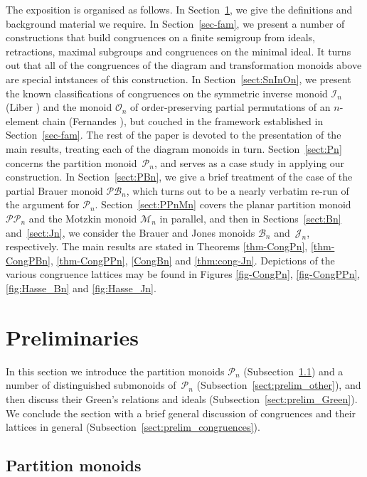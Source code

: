 \documentclass[11pt,a4paper]{article}
\newcommand{\PP}{\mathscr{P}\P}
\newcommand{\M}{\mathcal M}
\renewcommand{\O}{\mathcal O}
\newcommand{\I}{\mathcal I}
\newcommand{\B}{\mathcal B}
\renewcommand{\P}{\mathcal P}
\newcommand{\PB}{\mathcal{PB}}
\newcommand{\J}{\mathcal J}
\newcommand{\1}{\id_n}
\numberwithin{equation}{section}
\theoremstyle{definition}
\begin{document}
The exposition is organised as follows.  In Section~\ref{sect:prelim}, we give
the definitions and background material we require.  
%
In Section~\ref{sec-fam}, we present a number of constructions that build congruences on a finite semigroup from ideals, retractions, maximal subgroups and congruences on the minimal ideal.  It turns out that all of the congruences of the diagram and transformation monoids above are special intstances of this construction.  
%
In
Section~\ref{sect:SnInOn}, we present the known classifications of congruences
on the symmetric inverse monoid $\I_n$ (Liber \cite{Liber1953}) and the monoid
$\O_n$ of order-preserving partial permutations of an $n$-element chain (Fernandes
\cite{Fernandes2001}), but couched in the framework established in
Section~\ref{sec-fam}.  The rest of the paper is devoted to the
presentation of the main results, treating each of the diagram monoids in turn.
Section~\ref{sect:Pn} concerns the partition monoid~$\P_n$, and serves as
a case study in applying our construction.  In Section~\ref{sect:PBn}, we give a brief treatment of the case of the partial
Brauer monoid $\PB_n$, which turns out to be a nearly verbatim re-run of the
argument for $\P_n$.  Section~\ref{sect:PPnMn} covers the planar partition
monoid $\PP_n$ and the Motzkin monoid $\M_n$ in parallel, and then in 
Sections~\ref{sect:Bn} and~\ref{sect:Jn}, we consider the Brauer and Jones
monoids $\B_n$ and~$\J_n$, respectively.  
%
The main results are stated in Theorems \ref{thm-CongPn}, \ref{thm-CongPBn}, \ref{thm-CongPPn}, \ref{CongBn} and \ref{thm:cong-Jn}.  Depictions of the various congruence lattices may be found in Figures \ref{fig-CongPn}, \ref{fig-CongPPn}, \ref{fig:Hasse_Bn} and \ref{fig:Hasse_Jn}.

\section{Preliminaries}\label{sect:prelim}

In this section we introduce the partition monoids $\P_n$
(Subsection~\ref{sect:prelim_Pn}) and a number of distinguished submonoids
of~$\P_n$ (Subsection~\ref{sect:prelim_other}), and then discuss their Green's
relations and ideals (Subsection~\ref{sect:prelim_Green}).  We conclude the
section with a brief general discussion of congruences and their lattices in
general (Subsection~\ref{sect:prelim_congruences}).

\subsection{Partition monoids}\label{sect:prelim_Pn}
\end{document}
